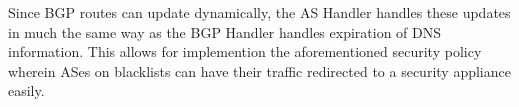 \documentclass{sig-alternate}
\newcommand\tti[1]{\small\texttt{#1}\normalsize}
\newcommand\system{NetAssay}
\begin{document}
Since BGP routes can update dynamically, the AS Handler handles these updates in much the same way as the BGP Handler handles expiration of DNS information. This allows for implemention the aforementioned security policy wherein ASes on blacklists can have their traffic redirected to a security appliance easily.

\begin{comment}
As \system{} is based on the SDX platform which contains a BGP-engine, we have access to BGP routes. The primary responsibilities are similar to those of the DNS handler, in that the AS handler needs to break down the high level policy into its constituent components and returning them to the MCM.

In the second example from section~\ref{sec:examples}, the AS handler would be responsible for breaking down the \tti{match\textunderscore{}AS()} into the constituent components. These components would be a series \tti{match()} actions on source IP addresses from packets to the IP ranges that AS~12345 was advertising. The parallel composition of all of these \tti{match()} would be composed with the \tti{drop()} action by the MCM.


Many networks, in particular home or small business networks, BGP information is not accessible. As such, this handler can be seen as optional.
\end{comment}


\end{document}
